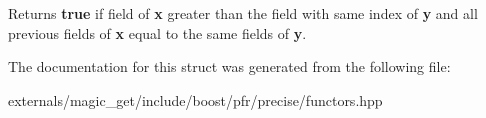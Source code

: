 \begin{DoxyReturn}{Returns}
{\bfseries true} if field of {\bfseries x} greater than the field with same index of {\bfseries y} and all previous fields of {\bfseries x} equal to the same fields of {\bfseries y}.
\end{DoxyReturn}


The documentation for this struct was generated from the following file\+:\begin{DoxyCompactItemize}
\item 
externals/magic\+\_\+get/include/boost/pfr/precise/functors.\+hpp\end{DoxyCompactItemize}
